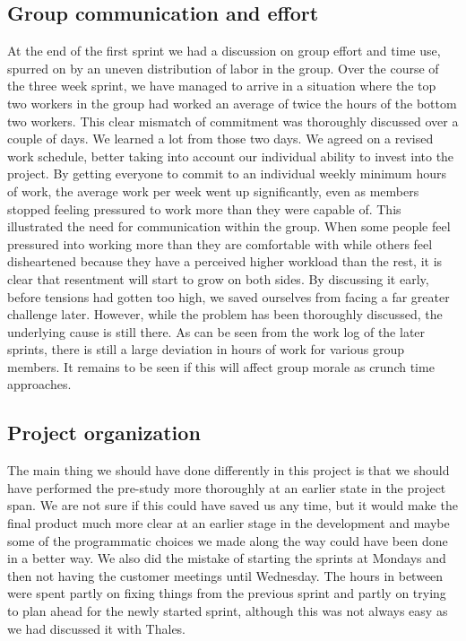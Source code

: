 \subsection{Group communication and effort}
At the end of the first sprint we had a discussion on group effort and time use, spurred on by an uneven distribution of labor in the group. Over the course of the three week sprint, we have managed to arrive in a situation where the top two workers in the group had worked an average of twice the hours of the bottom two workers. This clear mismatch of commitment was thoroughly discussed over a couple of days.
\newline
\newline
We learned a lot from those two days. We agreed on a revised work schedule, better taking into account our individual ability to invest into the project. By getting everyone to commit to an individual weekly minimum hours of work, the average work per week went up significantly, even as members stopped feeling pressured to work more than they were capable of.
\newline
\newline
This illustrated the need for communication within the group. When some people feel pressured into working more than they are comfortable with while others feel disheartened because they have a perceived higher workload than the rest, it is clear that resentment will start to grow on both sides. By discussing it early, before tensions had gotten too high, we saved ourselves from facing a far greater challenge later.
\newline
\newline
However, while the problem has been thoroughly discussed, the underlying cause is still there. As can be seen from the work log of the later sprints, there is still a large deviation in hours of work for various group members. It remains to be seen if this will affect group morale as crunch time approaches.

\subsection{Project organization}
The main thing we should have done differently in this project is that we should have performed the pre-study more thoroughly at an earlier state in the project span. We are not sure if this could have saved us any time, but it would make the final product much more clear at an earlier stage in the development and maybe some of the programmatic choices we made along the way could have been done in a better way. We also did the mistake of starting the sprints at Mondays and then not having the customer meetings until Wednesday. The hours in between were spent partly on fixing things from the previous sprint and partly on trying to plan ahead for the newly started sprint, although this was not always easy as we had discussed it with Thales.

